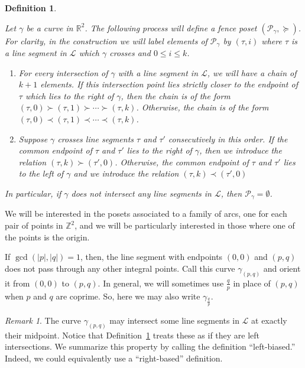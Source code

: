 \documentclass{article}
\newtheorem{definition}[theorem]{Definition}
\theoremstyle{remark}
\newtheorem{remark}[theorem]{Remark}
\newcommand{\fqp}{\frac{q}{p}}
\newcommand{\calP}{\mathcal{P}}
\begin{document}
\begin{definition}\label{def:PosetPpq}

Let $\gamma$ be a curve in $\mathbb{R}^2$. The following process will define a fence poset $(\calP_{\gamma},\succeq)$. 
For clarity, in the construction we will label elements of $\calP_{\gamma}$ by $(\tau,i)$ where $\tau$ is a line segment in $\mathcal{L}$ which $\gamma$ crosses and $0 \leq i \leq k$. 

\begin{enumerate}[label = (\arabic*)]
    \item For every intersection of $\gamma$ with a line segment in $\mathcal{L}$, we will have a chain of $k+1$ elements. If this intersection point lies strictly closer to the endpoint of $\tau$ which lies to the right of $\gamma$, then the chain is of the form $(\tau,0) \succ (\tau,1) \succ \cdots \succ (\tau,k)$. Otherwise, the chain is of the form $(\tau,0) \prec (\tau,1) \prec \cdots \prec (\tau,k)$.
    \item  Suppose $\gamma$ crosses line segments $\tau$ and $\tau'$ consecutively in this order. If the common endpoint of $\tau$ and $\tau'$ lies to the right of $\gamma$, then we introduce the relation $(\tau,k) \succ (\tau',0)$. Otherwise, the common endpoint of $\tau$ and $\tau'$ lies to the left of $\gamma$ and we introduce the relation $(\tau,k) \prec (\tau',0)$
\end{enumerate}

In particular, if $\gamma$ does not intersect any line segments in $\mathcal{L}$, then $\calP_{\gamma} = \emptyset$. 
\end{definition}

We will be interested in the posets associated to a family of arcs, one for each pair of points in $\mathbb{Z}^2$, and we will be particularly interested in those where one of the points is the origin.

If $\gcd(\vert p\vert,\vert q \vert) = 1$, then, the line segment with endpoints $(0,0)$ and $(p,q)$ does not pass through any other integral points. Call this curve $\gamma_{(p,q)}$ and orient it from $(0,0)$ to $(p,q)$. In general, we will sometimes use $\fqp$ in place of $(p,q)$ when $p$ and $q$ are coprime. So, here we may also write $\gamma_\fqp$.

\begin{remark}\label{rem:LeftBias}
The curve $\gamma_{(p,q)}$ may intersect some line segments in $\mathcal{L}$ at exactly their midpoint. Notice that Definition~\ref{def:PosetPpq} treats these as if they are left intersections. We summarize this property by calling the definition ``left-biased.''  
Indeed, we could equivalently use a ``right-based'' definition.
\end{remark}
\end{document}
